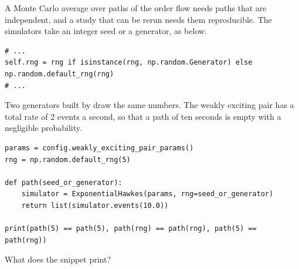 \begin{question}
\label{question.seedsOfAnOrderFlowMonteCarlo}
A Monte Carlo average over paths of the order flow needs paths that are independent,
and a study that can be rerun needs them reproducible.
The simulators take an integer seed or a generator, as below.
\begin{lstlisting}[caption={\protect\codehl{unito26.lob.hawkes.\_HawkesState.\_\_init\_\_}: the generator.}, label=listing.seedsOfAnOrderFlowMonteCarloQuote]
# ...
self.rng = rng if isinstance(rng, np.random.Generator) else np.random.default_rng(rng)
# ...
\end{lstlisting}
Two generators built by  draw the same numbers.
The weakly exciting pair has a total rate of 2 events a second,
so that a path of ten seconds is empty with a negligible probability.
\begin{lstlisting}[caption={Paths from a seed and from a generator}, label=listing.seedsOfAnOrderFlowMonteCarloRun]
params = config.weakly_exciting_pair_params()
rng = np.random.default_rng(5)

def path(seed_or_generator):
    simulator = ExponentialHawkes(params, rng=seed_or_generator)
    return list(simulator.events(10.0))

print(path(5) == path(5), path(rng) == path(rng), path(5) == path(rng))
\end{lstlisting}
What does the snippet print?
\begin{choices}
 \choice {}
 \correctchoice {}
 \choice {}
 \choice {}
\end{choices}
\end{question}

